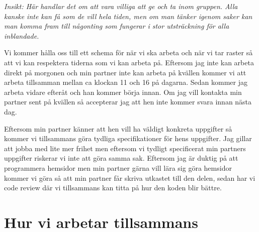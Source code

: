 \documentclass{mall}
\begin{document}
\begin{itemize}
 \emph{ Insikt: Här handlar det om att vara villiga att ge och ta inom gruppen. Alla kanske inte kan få som de vill
  hela tiden, men om man tänker igenom saker kan man komma fram till någonting som fungerar i stor utsträckning
  för alla inblandade.}

  Vi kommer hålla oss till ett schema för när vi ska arbeta och när vi tar raster så att vi kan respektera
  tiderna som vi kan arbeta på. Eftersom jag inte kan arbeta direkt på morgonen och min partner inte kan
  arbeta på kvällen kommer vi att arbeta tillsamman mellan ca klockan 11 och 16 på dagarna. Sedan kommer
  jag arbeta vidare efteråt och han kommer börja innan. Om jag vill kontakta min partner sent på kvällen
  så accepterar jag att hen inte kommer svara innan nästa dag.

  Eftersom min partner känner att hen vill ha väldigt konkreta uppgifter så kommer vi tillsammans göra tydliga
  specifikationer för hens uppgifter. Jag gillar att jobba med lite mer frihet men eftersom vi tydligt specificerat
  min partners uppgifter riskerar vi inte att göra samma sak. Eftersom jag är duktig på att programmera hemsidor men
  min partner gärna vill lära sig göra hemsidor kommer vi göra så att min partner får skriva utkastet till den delen,
  sedan har vi code review där vi tillsammans kan titta på hur den koden blir bättre.


\end{itemize}

\section{Hur vi arbetar tillsammans}
\end{document}
